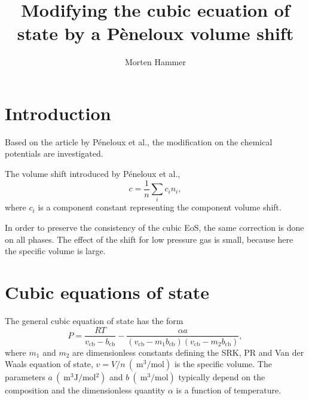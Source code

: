 \documentclass[english]{article}
\title{Modifying the cubic ecuation of state by a Pèneloux volume shift}
\author{Morten Hammer}
\newcommand{\cubic}{\text{cb}}
\begin{document}
\maketitle
\section{Introduction}
Based on the article by P{\'e}neloux et al.\cite{Peneloux1982}, the
modification on the chemical potentials are investigated.

The volume shift introduced by P{\'e}neloux et al.,
\begin{equation}
  c = \frac{1}{n}\underset{i}{\sum}c_i n_i,
\label{eq:volumeshift}
\end{equation}
where $c_i$ is a component constant representing the component volume
shift.

In order to preserve the consistency of the cubic EoS, the same
correction is done on all phases. The effect of the shift for low
pressure gas is small, because here the specific volume is large. 

\section{Cubic equations of state}
The general cubic equation of state has the form
\begin{equation}
  P = \frac{RT}{v_\cubic -b_\cubic} - 
  \frac{\alpha a}{(v_\cubic-m_1 b_\cubic)(v_\cubic-m_2 b_\cubic)},
\label{eq:gencubic}
\end{equation}
where $m_1$ and $m_2$ are dimensionless constants defining the SRK, PR
and Van der Waals equation of state, $v=V/n~(\SI{}{\meter^3\per\mol})$
is the specific volume. The parameters $a~(\SI{}{\meter^3\joule\per
  \mol^2})$ and $b~(\SI{}{\meter^3\per\mol})$ typically depend on the
composition and the dimensionless quantity $\alpha$ is a function of
temperature.
\end{document}

